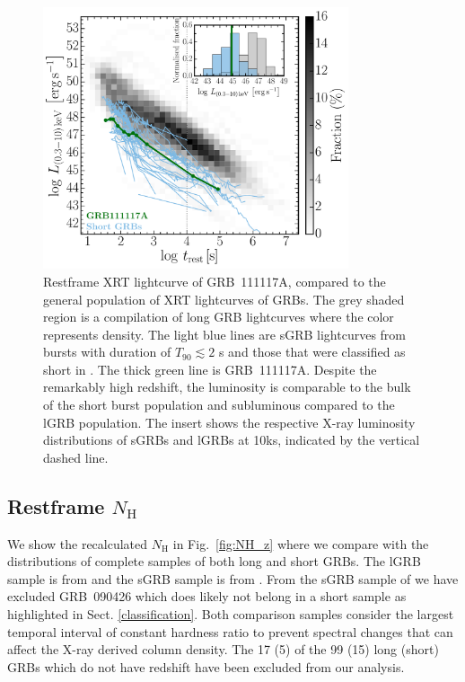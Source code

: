 \documentclass{aa}    %
\begin{document}
\begin{figure}
	\centering
	\includegraphics[width=9cm]{figures/XLC_111117A_rest.pdf}
	\caption{Restframe XRT lightcurve of GRB~111117A, compared to the general population of XRT lightcurves of GRBs. The grey shaded region is a compilation of long GRB lightcurves \citep{Evans2007, Evans2009} where the color represents density. The light blue lines are sGRB lightcurves from bursts with duration of $T_{90} \lesssim 2$ s and those that were classified as short in \citet{Kann2011, Berger2014, DAvanzo2014a}. The thick green line is GRB~111117A. Despite the remarkably high redshift, the luminosity is comparable to the bulk of the short burst population and subluminous compared to the lGRB population. The insert shows the respective X-ray luminosity distributions of sGRBs and lGRBs at 10ks, indicated by the vertical dashed line.}
	\label{fig:sxray_lightcurve}
\end{figure}

\subsection{Restframe $N_\mathrm{H}$} \label{restnH}

We show the recalculated $N_\mathrm{H}$ in Fig.~\ref{fig:NH_z} where we compare
with the distributions of complete samples of both long and short GRBs. The lGRB
sample is from \citet{Arcodia2016} and the sGRB sample is from
\citet{DAvanzo2014a}. From the sGRB sample of \citet{DAvanzo2014a} we have
excluded GRB~090426 which does likely not belong in a short sample as highlighted in
Sect. \ref{classification}. Both comparison samples consider the largest
temporal interval of constant hardness ratio to prevent spectral changes that
can affect the X-ray derived column density. The 17 (5) of the 99 (15) long
(short) GRBs which do not have redshift have been excluded from our analysis.
\end{document}
